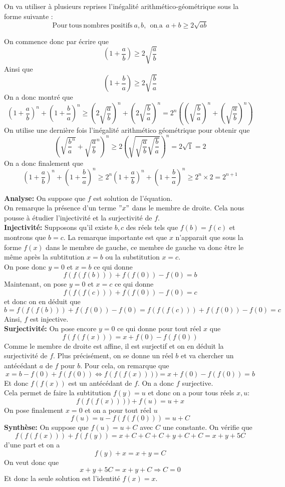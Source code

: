 \begin{sol}
On va utiliser à plusieurs reprises l'inégalité arithmético-géométrique sous la forme suivante :
$$\mathrm{Pour}\: \mathrm{ tous}\: \mathrm{ nombres}\: \mathrm{ positifs }\:a,b,\:\: \mathrm{on}_: \mathrm{ a }\:\:a+b\geq 2\sqrt{ab}  $$

On commence donc par écrire que 
$$\left(1+\frac{a}{b}\right)\geq 2\sqrt{\frac{a}{b}} $$
Ainsi que 
$$\left(1+\frac{b}{a}\right)\geq 2\sqrt{\frac{b}{a}} $$
On a donc montré que 
$$\left(1+\frac{a}{b}\right)^n+\left(1+\frac{b}{a}\right)^n\geq \left(2\sqrt{\frac{a}{b}}\right)^n+\left(2\sqrt{\frac{b}{a}}\right)^n=2^n\left(\left(\sqrt{\frac{b}{a}}\right)^n+\left(\sqrt{\frac{a}{b}}\right)^n \right) $$
On utilise une dernière fois l'inégalité arithmético géométrique pour obtenir que 
$$\left(\sqrt{\frac{b}{a}^n}+\sqrt{\frac{a}{b}}^n\right)^n\geq 2\left(\sqrt{\sqrt{\frac{a}{b}}\sqrt{\frac{b}{a}}}\right)^n=2\sqrt{1}=2 $$
On a donc finalement que 
$$\left(1+\frac{a}{b}\right)^n+\left(1+\frac{b}{a}\right)^n\geq 2^n\left(1+\frac{a}{b}\right)^n+\left(1+\frac{b}{a}\right)^n \geq2^n\times 2=2^{n+1} $$
\end{sol}
\begin{sol}
\textbf{Analyse:} On suppose que $f$ est solution de l'équation.
\\
On remarque la présence d'un terme $"x"$ dans le membre de droite. Cela nous pousse à étudier l'injectivité et la surjectivité de $f$.
\\
\textbf{Injectivité:} Supposons qu'il existe $b,c$ des réels tels que $f(b)=f(c)$ et montrons que $b=c$. La remarque importante est que $x$ n'apparait que sous la forme $f(x)$ dans le membre de gauche, ce membre de gauche va donc être le même après la subtitution $x=b$ ou la substitution $x=c$.
\\
On pose donc $y=0$ et $x=b$ ce qui donne 
$$f(f(f(b)))+f(f(0))-f(0)=b $$
Maintenant, on pose $y=0$ et $x=c$ ce qui donne
$$f(f(f(c)))+f(f(0))-f(0)=c $$ et donc on en déduit que
$$b=f(f(f(b)))+f(f(0))-f(0)=f(f(f(c)))+f(f(0))-f(0)=c $$
Ainsi, $f$ est injective.
\\
\textbf{Surjectivité:} On pose encore $y=0$ ce qui donne pour tout réel $x$ que 
$$f(f(f(x)))=x+f(0)-f(f(0)) $$
Comme le membre de droite est affine, il est surjectif et on en déduit la surjectivité de $f$. Plus précisément, on se donne un réel $b$ et va chercher un antécédant $a$ de $f$ pour $b$. Pour cela, on remarque que 
$$x=b-f(0)+f(f(0))\iff f(f(f(x))))=x+f(0)-f(f(0))=b $$
Et donc $f(f(x))$ est un antécédant de $f$. On a donc $f$ surjective. 
\\
Cela permet de faire la subtitution $f(y)=u$ et donc on a pour tous réels $x,u$:
$$f(f(f(x))))+f(u)=u+x $$
On pose finalement $x=0$ et on a pour tout réel $u$
$$f(u)=u-f(f(f(0)))=u+C $$
\textbf{Synthèse:} On suppose que $f(u)=u+C$ avec $C$ une constante. On vérifie que
$$f(f(f(x)))+f(f(y))=x+C+C+C+y+C+C=x+y+5C $$
d'une part et on a 
$$f(y)+x=x+y=C $$
On veut donc que 
$$x+y+5C=x+y+C\Rightarrow C=0 $$
Et donc la seule solution est l'identité $f(x)=x$.
\end{sol}
